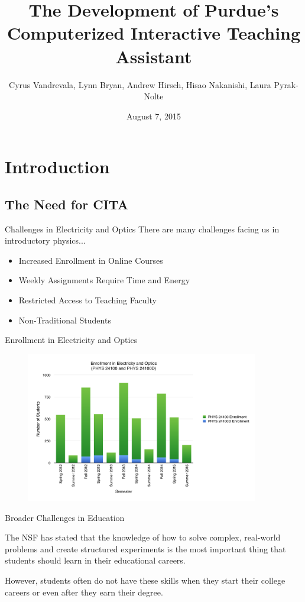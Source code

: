 \documentclass{beamer}
\title[The CITA on CHIP Project]{The Development of Purdue's Computerized Interactive Teaching Assistant}
\subtitle{Cyrus Vandrevala, Lynn Bryan, Andrew Hirsch, Hisao Nakanishi, Laura Pyrak-Nolte}
\date{August 7, 2015}
\begin{document}
\begin{frame}
  \titlepage
\end{frame}

\begin{frame}
  \tableofcontents
\end{frame}

\section{Introduction}

\subsection*{The Need for CITA}

\begin{frame}{Challenges in Electricity and Optics}
There are many challenges facing us in introductory physics...
\vspace{5mm}
  \begin{itemize}
    \item Increased Enrollment in Online Courses
    \item Weekly Assignments Require Time and Energy
    \item Restricted Access to Teaching Faculty
    \item Non-Traditional Students
  \end{itemize}
\end{frame}

\begin{frame}{Enrollment in Electricity and Optics}
  \begin{figure}
    \includegraphics[width=4in]{img/chapter1/enrollment}
  \end{figure}
\end{frame}

\begin{frame}{Broader Challenges in Education}
\begin{center}
The NSF has stated that the knowledge of how to solve complex, real-world problems and create structured experiments is the most important thing that students should learn in their educational careers.
\vspace{5mm}

However, students often do not have these skills when they start their college careers or even after they earn their degree.
\end{center}
\end{frame}
\end{document}
